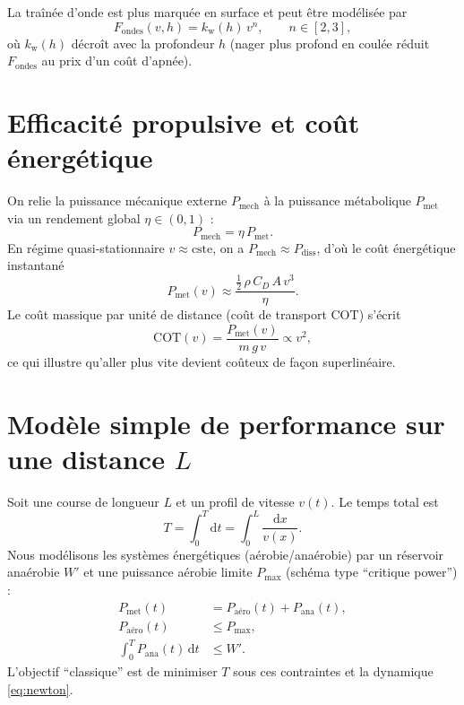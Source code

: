\documentclass[12pt,a4paper]{article}
\newcommand{\dd}{\mathrm{d}}
\begin{document}
La traînée d'onde est plus marquée en surface et peut être modélisée par
\begin{equation}
 F_{\mathrm{ondes}}(v,h) = k_\mathrm{w}(h)\,v^n, \qquad n\in[2,3],
 \end{equation}
où $k_\mathrm{w}(h)$ décroît avec la profondeur $h$ (nager plus profond en coulée réduit $F_{\mathrm{ondes}}$ au prix d'un coût d'apnée).

\section{Efficacité propulsive et coût énergétique}
On relie la puissance mécanique externe $P_{\mathrm{mech}}$ à la puissance métabolique $P_{\mathrm{met}}$ via un rendement global $\eta\in(0,1)$ :
\begin{equation}
 P_{\mathrm{mech}} = \eta\, P_{\mathrm{met}}.
 \end{equation}
En régime quasi-stationnaire $v\approx\text{cste}$, on a $P_{\mathrm{mech}}\approx P_{\mathrm{diss}}$, d'où le coût énergétique instantané
\begin{equation}
 P_{\mathrm{met}}(v) \approx \frac{\tfrac{1}{2}\,\rho\,C_D\,A\,v^3}{\eta}.
 \end{equation}
Le coût massique par unité de distance (coût de transport $\mathrm{COT}$) s'écrit
\begin{equation}
 \mathrm{COT}(v) = \frac{P_{\mathrm{met}}(v)}{m\,g\,v} \propto v^2, 
 \end{equation}
ce qui illustre qu'aller plus vite devient coûteux de façon superlinéaire.

\section{Modèle simple de performance sur une distance $L$}
Soit une course de longueur $L$ et un profil de vitesse $v(t)$. Le temps total est
\begin{equation}
 T = \int_0^{T} \dd t = \int_0^{L} \frac{\dd x}{v(x)}.
 \end{equation}
Nous modélisons les systèmes énergétiques (aérobie/anaérobie) par un réservoir anaérobie $W'$ et une puissance aérobie limite $P_{\max}$ (schéma type ``critique power'') :
\begin{align}
 P_{\mathrm{met}}(t) &= P_\mathrm{aéro}(t) + P_\mathrm{ana}(t), \\
 P_\mathrm{aéro}(t) &\le P_{\max}, \\
 \int_0^T P_\mathrm{ana}(t)\,\dd t &\le W'.
 \end{align}
L'objectif ``classique'' est de minimiser $T$ sous ces contraintes et la dynamique \eqref{eq:newton}.
\end{document}
